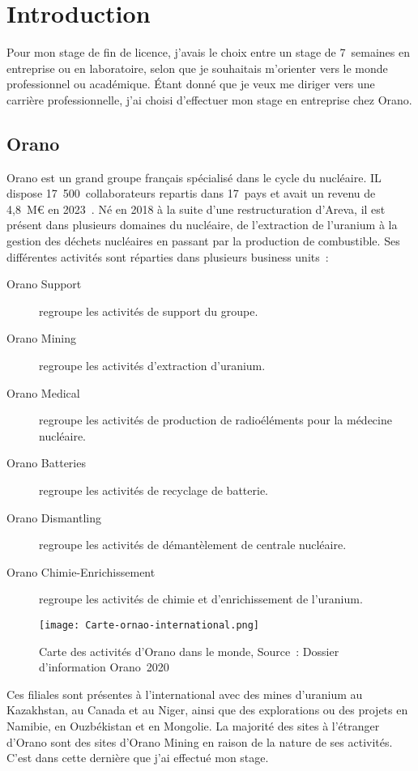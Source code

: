 \section{Introduction}

Pour mon stage de fin de licence, j'avais le choix entre un stage de 7~semaines en entreprise ou en laboratoire, selon que je souhaitais m'orienter vers le monde professionnel ou académique. Étant donné que je veux me diriger vers une carrière professionnelle, j'ai choisi d'effectuer mon stage en entreprise chez Orano.
\subsection{Orano}
Orano est un grand groupe français spécialisé dans le cycle du nucléaire. IL dispose 17~500~collaborateurs repartis dans 17~pays et avait un revenu de 4,8~M€ en 2023~\cite{report:rapport_activiter}. Né en 2018 à la suite d'une restructuration d'Areva, il est présent dans plusieurs domaines du nucléaire, de l'extraction de l'uranium à la gestion des déchets nucléaires en passant par la production de combustible. Ses différentes activités sont réparties dans plusieurs business units~:
\begin{description}
    \item [Orano Support]  regroupe les activités de support du groupe.
    \item [Orano Mining] regroupe les activités d'extraction d'uranium.
    \item [Orano Medical] regroupe les activités de production de radioéléments pour la médecine nucléaire.
    \item [Orano Batteries] regroupe les activités de recyclage de batterie.
    \item [Orano Dismantling] regroupe les activités de démantèlement de centrale nucléaire.
    \item [Orano Chimie-Enrichissement] regroupe les activités de chimie et d'enrichissement de l'uranium.
\end{description}
\begin{figure}[hb]
    \centering
    \texttt{[image: Carte-ornao-international.png]}
    \caption[Carte des activités d’Orano dans le monde]{Carte des activités d’Orano dans le monde, Source~: Dossier d’information Orano~2020}
    \label{fig_carte_orano}
\end{figure}


Ces filiales sont présentes à l'international avec des mines d'uranium au Kazakhstan, au Canada et au Niger, ainsi que des explorations ou des projets en Namibie, en Ouzbékistan et en Mongolie. La majorité des sites à l'étranger d'Orano sont des sites d'Orano Mining en raison de la nature de ses activités. C'est dans cette dernière que j'ai effectué mon stage.

